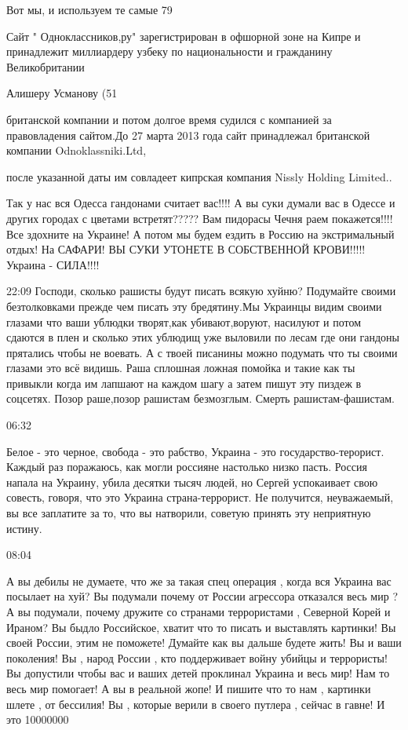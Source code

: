 {Вот мы, и используем те самые 79%

Сайт " Одноклассников,ру" зарегистрирован в офшорной зоне на Кипре и принадлежит миллиардеру узбеку по национальности и гражданину Великобритании 

Алишеру Усманову (51%

британской компании и потом долгое время судился с компанией за правовладения сайтом.До 27 марта 2013 года сайт принадлежал британской компании Odnoklassniki.Ltd, 

после указанной даты им совладеет кипрская компания Nissly Holding Limited..


Так у нас вся Одесса гандонами считает вас!!!! А вы суки думали вас в Одессе и
других городах с цветами встретят????? Вам пидорасы Чечня раем покажется!!!!
Все здохните на Украине! А потом мы будем ездить в Россию на экстримальный
отдых! На САФАРИ! ВЫ СУКИ УТОНЕТЕ В СОБСТВЕННОЙ КРОВИ!!!!! Украина - СИЛА!!!!

22:09
Господи, сколько рашисты будут писать всякую хуйню? Подумайте своими безтолковками прежде чем писать эту бредятину.Мы Украинцы видим своими глазами что ваши ублюдки творят,как убивают,воруют, насилуют и потом сдаются в плен и сколько этих ублюдищ уже выловили по лесам где они гандоны прятались чтобы не воевать.
А с твоей писанины можно подумать что ты своими глазами это всё видишь. Раша сплошная ложная помойка и такие как ты привыкли когда им лапшают на каждом шагу а затем пишут эту пиздеж в соцсетях.
Позор раше,позор рашистам безмозглым.
Смерть рашистам-фашистам.

06:32

Белое - это черное, свобода - это рабство, Украина - это государство-терорист.
Каждый раз поражаюсь, как могли россияне настолько низко пасть. Россия напала
на Украину, убила десятки тысяч людей, но Сергей успокаивает свою совесть,
говоря, что это Украина страна-террорист. Не получится, неуважаемый, вы все
заплатите за то, что вы натворили, советую принять эту неприятную истину.

08:04

А вы дебилы не думаете, что же за такая спец операция , когда вся Украина вас
посылает на хуй? Вы подумали почему от России агрессора отказался весь мир ? А
вы подумали, почему дружите со странами террористами , Северной Корей и Ираном?
Вы быдло Российское, хватит что то писать и выставлять картинки! Вы своей
России, этим не поможете! Думайте как вы дальше будете жить! Вы и ваши
поколения! Вы , народ России , кто поддерживает войну убийцы и террористы! Вы
допустили чтобы вас и ваших детей проклинал Украина и весь мир! Нам то весь мир
помогает! А вы в реальной жопе! И пишите что то нам , картинки шлете , от
бессилия! Вы , которые верили в своего путлера , сейчас в гавне! И это
10000000%

}
